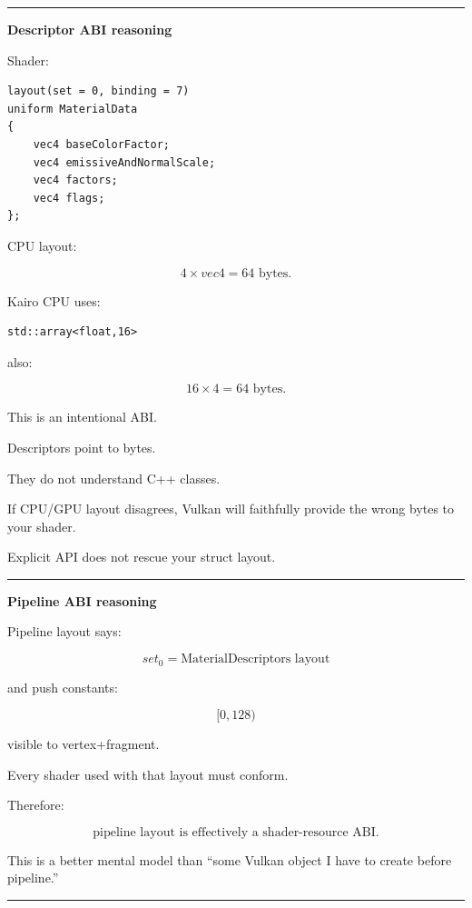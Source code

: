 \begin{center}\rule{0.5\linewidth}{0.5pt}\end{center}

\textbf{Descriptor ABI reasoning}

Shader:

\begin{verbatim}
layout(set = 0, binding = 7)
uniform MaterialData
{
    vec4 baseColorFactor;
    vec4 emissiveAndNormalScale;
    vec4 factors;
    vec4 flags;
};
\end{verbatim}

CPU layout:

\[
4\times vec4
=
64\text{ bytes}.
\]

Kairo CPU uses:

\begin{verbatim}
std::array<float,16>
\end{verbatim}

also:

\[
16\times4=64\text{ bytes}.
\]

This is an intentional ABI.

Descriptors point to bytes.

They do not understand C++ classes.

If CPU/GPU layout disagrees, Vulkan will faithfully provide the wrong bytes to your shader.

Explicit API does not rescue your struct layout.

\begin{center}\rule{0.5\linewidth}{0.5pt}\end{center}

\textbf{Pipeline ABI reasoning}

Pipeline layout says:

\[
set_0
=
\text{MaterialDescriptors layout}
\]

and push constants:

\[
[0,128)
\]

visible to vertex+fragment.

Every shader used with that layout must conform.

Therefore:

\[
\boxed{
\text{pipeline layout is effectively a shader-resource ABI}.
}
\]

This is a better mental model than ``some Vulkan object I have to create before pipeline.''

\begin{center}\rule{0.5\linewidth}{0.5pt}\end{center}

